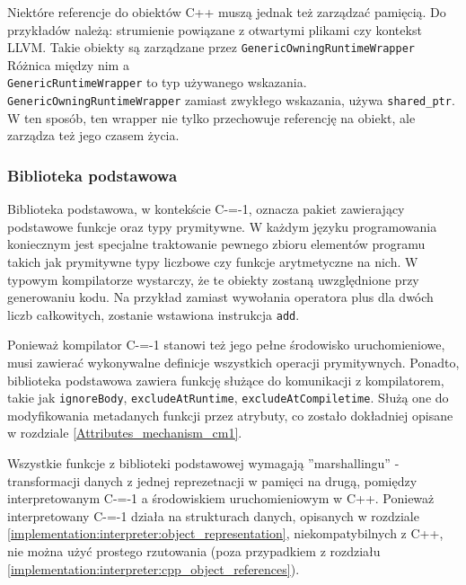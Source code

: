 Niektóre referencje do obiektów C++ muszą jednak też zarządzać pamięcią.
Do przykładów należą: strumienie powiązane z otwartymi plikami czy kontekst LLVM.
Takie obiekty są zarządzane przez \lstinline{GenericOwningRuntimeWrapper}
Różnica między nim a \\\lstinline{GenericRuntimeWrapper} to typ używanego wskazania.
\lstinline{GenericOwningRuntimeWrapper} zamiast zwykłego wskazania, używa \lstinline{shared_ptr}.
W ten sposób, ten wrapper nie tylko przechowuje referencję na obiekt, ale zarządza też jego czasem życia.

\subsubsection{Biblioteka podstawowa}
\label{implementation:interpreter:basic_library}

Biblioteka podstawowa, w kontekście C-=-1, oznacza pakiet zawierający podstawowe funkcje oraz typy prymitywne.
W każdym języku programowania koniecznym jest specjalne traktowanie pewnego zbioru elementów programu takich jak prymitywne typy liczbowe czy funkcje arytmetyczne na nich.
W typowym kompilatorze wystarczy, że te obiekty zostaną uwzględnione przy generowaniu kodu.
Na przykład zamiast wywołania operatora plus dla dwóch liczb całkowitych, zostanie wstawiona instrukcja \lstinline{add}.

Ponieważ kompilator C-=-1 stanowi też jego pełne środowisko uruchomieniowe, musi zawierać wykonywalne definicje wszystkich operacji prymitywnych.
Ponadto, biblioteka podstawowa zawiera funkcję służące do komunikacji z kompilatorem, takie jak \lstinline{ignoreBody}, \lstinline{excludeAtRuntime}, \lstinline{excludeAtCompiletime}.
Służą one do modyfikowania metadanych funkcji przez atrybuty, co zostało dokładniej opisane w rozdziale \ref{Attributes_mechanism_cm1}.

Wszystkie funkcje z biblioteki podstawowej wymagają ''marshallingu'' - transformacji danych z jednej reprezetnacji w pamięci na drugą, pomiędzy interpretowanym C-=-1 a środowiskiem uruchomieniowym w C++.
Ponieważ interpretowany C-=-1 działa na strukturach danych, opisanych w rozdziale \ref{implementation:interpreter:object_representation}, niekompatybilnych z C++, nie można użyć prostego rzutowania (poza przypadkiem z rozdziału \ref{implementation:interpreter:cpp_object_references}).

